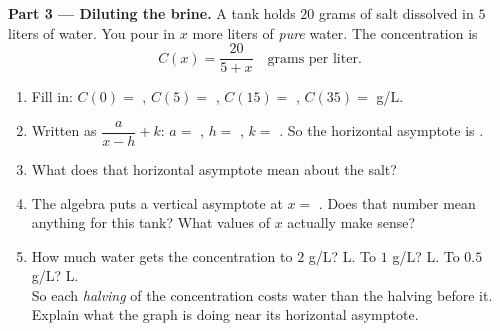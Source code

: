 \documentclass[10pt]{article}
\begin{document}
\begin{tcolorbox}[colback=white, colframe=black!40, title=\textbf{Tier E --- Extension},
    fonttitle=\bfseries, arc=1.5mm, left=3mm, right=3mm, top=2mm, bottom=2mm, breakable]
\vspace{5pt}
\textbf{Part 3 --- Diluting the brine.} A tank holds $20$ grams of salt dissolved in $5$ liters of
water. You pour in $x$ more liters of \emph{pure} water. The concentration is
\[ C(x)=\frac{20}{5+x} \quad \text{grams per liter.} \]
\begin{enumerate}[label=(\alph*), leftmargin=1.9em, itemsep=6pt]
  \item Fill in: $C(0)=$ \blank{1.0cm}, \; $C(5)=$ \blank{1.0cm}, \; $C(15)=$ \blank{1.0cm}, \;
        $C(35)=$ \blank{1.0cm} g/L.
  \item Written as $\dfrac{a}{x-h}+k$: \; $a=$ \blank{0.8cm}, \; $h=$ \blank{0.8cm}, \;
        $k=$ \blank{0.8cm}. So the horizontal asymptote is \blank{1.2cm}.
  \item What does that horizontal asymptote mean about the salt? \writeline
  \item The algebra puts a vertical asymptote at $x=$ \blank{1.2cm}. Does that number mean anything
        for this tank? \blank{1.2cm} \; What values of $x$ actually make sense? \blank{2.0cm}
  \item How much water gets the concentration to $2$ g/L? \blank{1.4cm} L. \; To $1$ g/L?
        \blank{1.4cm} L. \; To $0.5$ g/L? \blank{1.4cm} L. \\[3pt]
        So each \emph{halving} of the concentration costs \blank{1.6cm} water than the halving before
        it. Explain what the graph is doing near its horizontal asymptote. 
\end{enumerate}
\end{tcolorbox}
\end{document}
